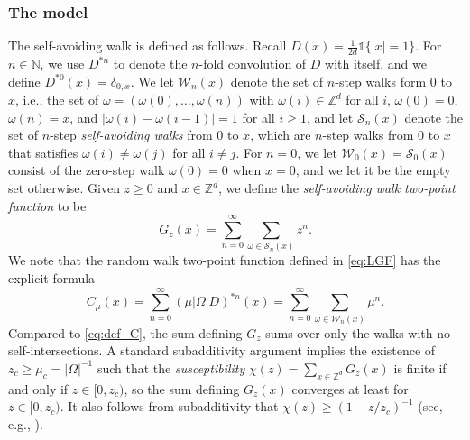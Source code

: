 \documentclass[11pt,hidelinks]{article}
\theoremstyle{plain}
\numberwithin{equation}{section}
\newcommand{\ie}{i.e.}
\newcommand{\N}{\mathbb{N}}
\newcommand{\Z}{\mathbb{Z}}
\newcommand{\Scal}{\mathcal{S}}
\newcommand{\Wcal}{\mathcal{W}}
\newcommand{\inv}{^{-1}}
\renewcommand{\(}{\left(}
\renewcommand{\)}{\right)}
\newcommand{\1}{\mathds{1}}
\providecommand{\abs}[1]{\lvert#1\rvert}
\begin{document}
\subsubsection{The model}
The self-avoiding walk is defined as follows. 
Recall $D(x) = \frac 1 {2d}  \1\{\abs x=1\}$.
For $n\in \N$, we use $D^{*n}$ to denote the $n$-fold convolution of $D$ with itself, and we define $D^{*0}(x) = \delta_{0,x}$. 
We let $\mathcal W_n(x)$ denote the set of $n$-step walks form 0 to $x$, \ie, the set of $\omega = (\omega(0), \dots, \omega(n))$ with $\omega(i) \in \Z^d$ for all $i$, $\omega(0)=0$, $\omega(n)=x$, and $ \abs{ \omega(i) - \omega(i-1) } = 1$ for all $i\ge 1$,
and let $\mathcal S_n(x)$ denote the set of $n$-step \emph{self-avoiding walks} from 0 to $x$, which are $n$-step walks from 0 to $x$ that satisfies $\omega(i) \ne \omega(j)$ for all $i\ne j$. 
For $n=0$, we let $\mathcal W_0(x) = \mathcal S_0(x)$ consist of the zero-step walk $\omega(0)=0$ when $x=0$, and we let it be the empty set otherwise. 
Given $z\ge 0$ and $x\in \Z^d$, we define the \emph{self-avoiding walk two-point function} to be
\begin{equation} \label{eq:def_G}
G_z(x) = \sum_{n=0}^\infty \sum_{\omega \in \Scal_n(x) } z^n.
\end{equation}
We note that the random walk two-point function defined in \eqref{eq:LGF} has the explicit formula
\begin{equation} \label{eq:def_C}
C_\mu(x) = \sum_{n=0}^\infty  (\mu \abs\Omega D)^{*n}(x)
= \sum_{n=0}^\infty \sum_{\omega \in \Wcal_n(x) } \mu^n. 
\end{equation}
Compared to \eqref{eq:def_C}, the sum defining $G_z$ sums over only the walks with no self-intersections. 
A standard subadditivity argument implies the existence of $z_c \ge \mu_c = \abs\Omega\inv$ such that the \emph{susceptibility} $\chi(z) = \sum_{x\in\Z^d} G_z(x)$ is finite if and only if $z \in [0,z_c)$, so the sum defining $G_z(x)$ converges at least for $z \in [0, z_c)$. 
It also follows from subadditivity that $\chi(z) \ge (1- z/z_c)\inv$ (see, e.g., \cite[Theorem~2.3]{Slad06}). 
\end{document}
